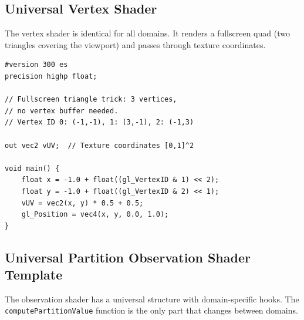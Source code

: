 \documentclass[11pt,twocolumn,a4paper]{article}
\begin{document}
\subsection{Universal Vertex Shader}

The vertex shader is identical for all domains. It renders a
fullscreen quad (two triangles covering the viewport) and passes
through texture coordinates.

\begin{lstlisting}[style=glsl,caption={Universal Vertex Shader (same for all domains)}]
#version 300 es
precision highp float;

// Fullscreen triangle trick: 3 vertices,
// no vertex buffer needed.
// Vertex ID 0: (-1,-1), 1: (3,-1), 2: (-1,3)

out vec2 vUV;  // Texture coordinates [0,1]^2

void main() {
    float x = -1.0 + float((gl_VertexID & 1) << 2);
    float y = -1.0 + float((gl_VertexID & 2) << 1);
    vUV = vec2(x, y) * 0.5 + 0.5;
    gl_Position = vec4(x, y, 0.0, 1.0);
}
\end{lstlisting}

\subsection{Universal Partition Observation Shader Template}

The observation shader has a universal structure with domain-specific
hooks. The \texttt{computePartitionValue} function is the only part
that changes between domains.
\end{document}
